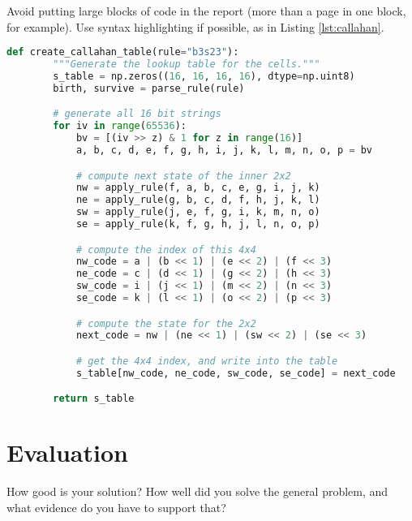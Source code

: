 \documentclass{l4proj}
\begin{document}

Avoid putting large blocks of code in the report (more than a page in one block, for example). Use syntax highlighting if possible, as in Listing \ref{lst:callahan}.

\begin{lstlisting}[language=python, float, caption={The algorithm for packing the $3\times 3$ outer-totalistic binary CA successor rule into a 
    $16\times 16\times 16\times 16$ 4 bit lookup table, running an equivalent, notionally 16-state $2\times 2$ CA.}, label=lst:callahan]
    def create_callahan_table(rule="b3s23"):
        """Generate the lookup table for the cells."""        
        s_table = np.zeros((16, 16, 16, 16), dtype=np.uint8)
        birth, survive = parse_rule(rule)

        # generate all 16 bit strings
        for iv in range(65536):
            bv = [(iv >> z) & 1 for z in range(16)]
            a, b, c, d, e, f, g, h, i, j, k, l, m, n, o, p = bv

            # compute next state of the inner 2x2
            nw = apply_rule(f, a, b, c, e, g, i, j, k)
            ne = apply_rule(g, b, c, d, f, h, j, k, l)
            sw = apply_rule(j, e, f, g, i, k, m, n, o)
            se = apply_rule(k, f, g, h, j, l, n, o, p)

            # compute the index of this 4x4
            nw_code = a | (b << 1) | (e << 2) | (f << 3)
            ne_code = c | (d << 1) | (g << 2) | (h << 3)
            sw_code = i | (j << 1) | (m << 2) | (n << 3)
            se_code = k | (l << 1) | (o << 2) | (p << 3)

            # compute the state for the 2x2
            next_code = nw | (ne << 1) | (sw << 2) | (se << 3)

            # get the 4x4 index, and write into the table
            s_table[nw_code, ne_code, sw_code, se_code] = next_code

        return s_table

\end{lstlisting}

\chapter{Evaluation} 
How good is your solution? How well did you solve the general problem, and what evidence do you have to support that?
\end{document}

